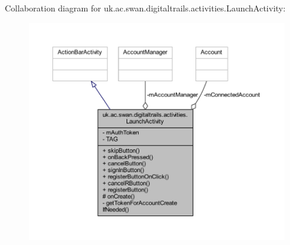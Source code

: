 Collaboration diagram for uk.\+ac.\+swan.\+digitaltrails.\+activities.\+Launch\+Activity\+:
\nopagebreak
\begin{figure}[H]
\begin{center}
\leavevmode
\includegraphics[width=350pt]{classuk_1_1ac_1_1swan_1_1digitaltrails_1_1activities_1_1_launch_activity__coll__graph}
\end{center}
\end{figure}
